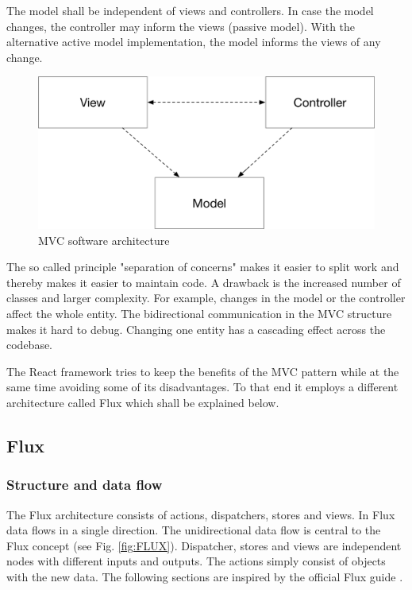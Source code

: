 The model shall be independent of views and controllers. In case the model changes, 
the controller may inform the views (passive model). With the alternative active model 
implementation, the model informs the views of any change.

\begin{figure}[H]
	\centering
	\includegraphics[scale=0.6]{bilder/grundlagen/MVC.png}
	\caption{MVC  software architecture  \cite{GOLL}}
	\label{fig:MVC}
\end{figure}

The so called principle "separation of concerns" makes it easier to split work and thereby 
makes it easier to maintain code.
A drawback is the increased number of classes and larger complexity.
For example,  changes in the model or the controller affect the whole entity. 
The bidirectional communication in the MVC structure makes it hard to debug.
Changing one entity has a cascading effect across the codebase.

The React framework tries to keep the benefits of the MVC pattern while at the same time 
avoiding some of its disadvantages. To that end it employs a different architecture called
Flux which shall be explained below.

\subsection{Flux}

\subsubsection{Structure and data flow}
The Flux architecture consists of actions, dispatchers, stores and views. In Flux data flows in a single direction.
The unidirectional data flow is central to the Flux concept (see Fig. \ref{fig:FLUX}).
Dispatcher, stores and views are independent nodes with different inputs and outputs. The actions simply consist of objects with the new data. The following sections are inspired by the official Flux guide \cite{Flux}.

